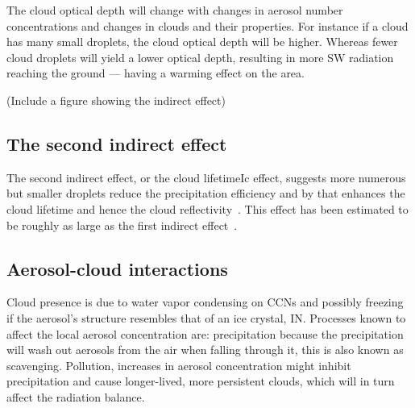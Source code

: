 The cloud optical depth will change with changes in aerosol number concentrations and changes in clouds and their properties. For instance if a cloud has many small droplets, the cloud optical depth will be higher. Whereas fewer cloud droplets will yield a lower optical depth, resulting in more SW radiation reaching the ground —  having a warming effect on the area. 

(Include a figure showing the indirect effect)

\subsection{The second indirect effect}

The second indirect effect, or the cloud lifetimeIc effect, suggests more numerous but smaller droplets reduce the precipitation efficiency and by that enhances the cloud lifetime and hence the cloud reflectivity~\citep{Albrecht1989}. This effect has been estimated to be roughly as large as the first indirect effect~\citep{Lohmann2005}.

\subsection{Aerosol-cloud interactions}

Cloud presence is due to water vapor condensing on CCNs and possibly freezing if the aerosol's structure resembles that of an ice crystal, IN. Processes known to affect the local aerosol concentration are: precipitation because the precipitation will wash out aerosols from the air when falling through it, this is also known as scavenging. Pollution, increases in aerosol concentration might inhibit precipitation and cause longer-lived, more persistent clouds, which will in turn affect the radiation balance.


 